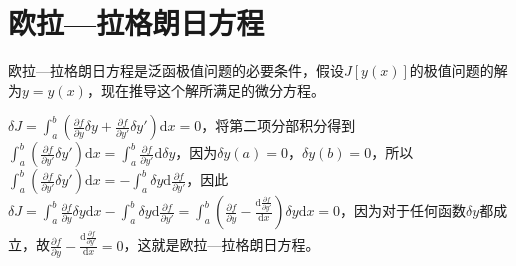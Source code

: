 \documentclass{article}
\begin{document}
\section{欧拉—拉格朗日方程}
欧拉—拉格朗日方程是泛函极值问题的必要条件，假设$J[y(x)]$的极值问题的解为$y=y(x)$，现在推导这个解所满足的微分方程。

$\delta J=\int_{a}^{b}(\frac{\partial f}{\partial y}\delta y + \frac{\partial f}{\partial y'}\delta y')\mathrm{d}x=0$，将第二项分部积分得到$\int_{a}^{b}(\frac{\partial f}{\partial y'}\delta y')\mathrm{d}x=\int_{a}^{b}\frac{\partial f}{\partial y'}\mathrm{d}\delta y$，因为$\delta y(a)=0$，$\delta y(b)=0$，所以$\int_{a}^{b}(\frac{\partial f}{\partial y'}\delta y')\mathrm{d}x=-\int_{a}^{b}\delta y\mathrm{d}\frac{\partial f}{\partial y'}$，因此$\delta J=\int_{a}^{b}\frac{\partial f}{\partial y}\delta y\mathrm{d}x-\int_{a}^{b}\delta y\mathrm{d}\frac{\partial f}{\partial y'}=\int_{a}^{b}(\frac{\partial f}{\partial y}-\frac{\mathrm{d}\frac{\partial f}{\partial y'}}{\mathrm{d}x})\delta y\mathrm{d}x=0$，因为对于任何函数$\delta y$都成立，故$\frac{\partial f}{\partial y}-\frac{\mathrm{d}\frac{\partial f}{\partial y'}}{\mathrm{d}x}=0$，这就是欧拉—拉格朗日方程。



\end{document}
